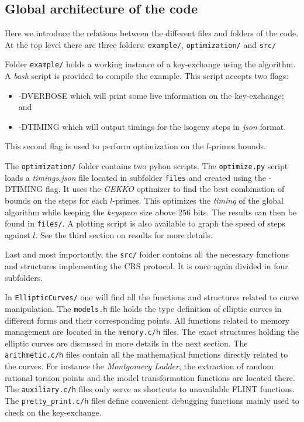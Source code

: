 \documentclass[../main.tex]{subfilesubs}
\begin{document}
\subsection{Global architecture of the code}
Here we introduce the relations between the different files and folders of the code.
At the top level there are three folders: \texttt{example/}, \texttt{optimization/} and \texttt{src/}

Folder \texttt{example/} holds a working instance of a key-exchange using the algorithm.
A \textit{bash} script is provided to compile the example.
This script accepts two flags:
	\begin{itemize}
		\item -DVERBOSE which will print some live information on the key-exchange; and
		\item -DTIMING which will output timings for the isogeny steps in \textit{json} format.
	\end{itemize}
This second flag is used to perform optimization on the $l$-primes bounds.

The \texttt{optimization/} folder contains two pyhon scripts.
The \texttt{optimize.py} script loads a \textit{timings.json} file located in subfolder \texttt{files} and created using the -DTIMING flag.
It uses the \textit{GEKKO} optimizer to find the best combination of bounds on the steps for each $l$-primes.
This optimizes the \textit{timing} of the global algorithm while keeping the \textit{keyspace} size above $256$ bits.
The results can then be found in \texttt{files/}.
A plotting script is also available to graph the speed of steps against $l$.
See the third section on results for more details.

Last and most importantly, the \texttt{src/} folder contains all the necessary functions and structures implementing the CRS protocol.
It is once again divided in four subfolders.

In \texttt{EllipticCurves/} one will find all the functions and structures related to curve manipulation.
The \texttt{models.h} file holds the type definition of elliptic curves in different forms and their corresponding points.
All functions related to memory management are located in the \texttt{memory.c/h} files.
The exact structures holding the elliptic curves are discussed in more details in the next section.
The \texttt{arithmetic.c/h} files contain all the mathematical functions directly related to the curves.
For instance the \textit{Montgomery Ladder}, the extraction of random rational torsion points and the model transformation functions are located there.
The \texttt{auxiliary.c/h} files only serve as shortcuts to unavailable FLINT functions.
The \texttt{pretty\_print.c/h} files define convenient debugging functions mainly used to check on the key-exchange.
\end{document}
